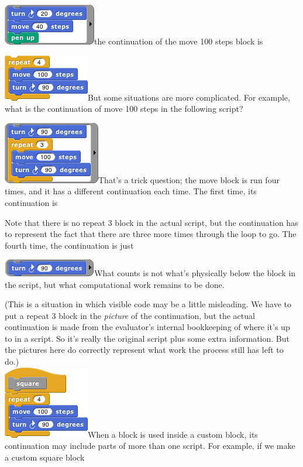 \includegraphics[width=1.59375in,height=0.70833in]{media/image875.png}the
continuation of the move 100 steps block is

\includegraphics[width=1.47847in,height=0.80208in]{media/image876.png}But
some situations are more complicated. For example, what is the
continuation of move 100 steps in the following script?

\includegraphics[width=1.66667in,height=1.07292in]{media/image877.png}That's
a trick question; the move block is run four times, and it has a
different continuation each time. The first time, its continuation is

Note that there is no repeat 3 block in the actual script, but the
continuation has to represent the fact that there are three more times
through the loop to go. The fourth time, the continuation is just

\includegraphics[width=1.59375in,height=0.29792in]{media/image878.png}What
counts is not what's physically below the block in the script, but what
computational work remains to be done.

(This is a situation in which visible code may be a little misleading.
We have to put a repeat 3 block in the \emph{picture} of the
continuation, but the actual continuation is made from the evaluator's
internal bookkeeping of where it's up to in a script. So it's really the
original script plus some extra information. But the pictures here do
correctly represent what work the process still has left to do.)\\
\includegraphics[width=1.47917in,height=1.25in]{media/image879.png}When
a block is used inside a custom block, its continuation may include
parts of more than one script. For example, if we make a custom square
block

